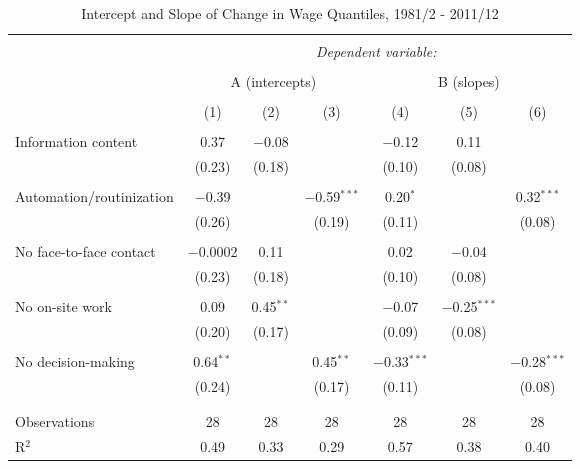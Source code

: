 

\begin{sidewaystable}[!htbp] \centering 
  \caption{Intercept and Slope of Change in Wage Quantiles, 1981/2 - 2011/12} 
  \label{tab:quantreg1} 
\begin{tabular}{@{\extracolsep{0pt}}lcccccc} 
\\[-1.8ex]\hline 
\hline \\[-1.8ex] 
 & \multicolumn{6}{c}{\textit{Dependent variable:}} \\ 
\cline{2-7} 
\\[-1.8ex] & \multicolumn{3}{c}{A (intercepts)} & \multicolumn{3}{c}{B (slopes)} \\ 
\\[-1.8ex] & (1) & (2) & (3) & (4) & (5) & (6)\\ 
\hline \\[-1.8ex] 
 Information content & 0.37 & $-$0.08 &  & $-$0.12 & 0.11 &  \\ 
  & (0.23) & (0.18) &  & (0.10) & (0.08) &  \\ 
  & & & & & & \\ 
 Automation/routinization & $-$0.39 &  & $-$0.59$^{***}$ & 0.20$^{*}$ &  & 0.32$^{***}$ \\ 
  & (0.26) &  & (0.19) & (0.11) &  & (0.08) \\ 
  & & & & & & \\ 
 No face-to-face contact & $-$0.0002 & 0.11 &  & 0.02 & $-$0.04 &  \\ 
  & (0.23) & (0.18) &  & (0.10) & (0.08) &  \\ 
  & & & & & & \\ 
 No on-site work & 0.09 & 0.45$^{**}$ &  & $-$0.07 & $-$0.25$^{***}$ &  \\ 
  & (0.20) & (0.17) &  & (0.09) & (0.08) &  \\ 
  & & & & & & \\ 
 No decision-making & 0.64$^{**}$ &  & 0.45$^{**}$ & $-$0.33$^{***}$ &  & $-$0.28$^{***}$ \\ 
  & (0.24) &  & (0.17) & (0.11) &  & (0.08) \\ 
  & & & & & & \\ 
\hline \\[-1.8ex] 
Observations & 28 & 28 & 28 & 28 & 28 & 28 \\ 
R$^{2}$ & 0.49 & 0.33 & 0.29 & 0.57 & 0.38 & 0.40 \\ 

\end{tabular}
\end{sidewaystable}
